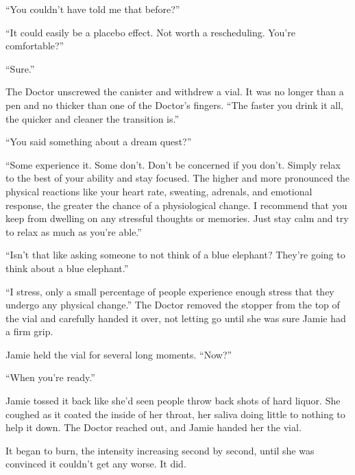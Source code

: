 ``You couldn't have told me that before?''



``It could easily be a placebo effect.  Not worth a rescheduling.  You're comfortable?''



``Sure.''



The Doctor unscrewed the canister and withdrew a vial.  It was no longer than a pen and no thicker than one of the Doctor's fingers.  ``The faster you drink it all, the quicker and cleaner the transition is.''



``You said something about a dream quest?''



``Some experience it.  Some don't.  Don't be concerned if you don't.  Simply relax to the best of your ability and stay focused.  The higher and more pronounced the physical reactions like your heart rate, sweating, adrenals, and emotional response, the greater the chance of a physiological change.  I recommend that you keep from dwelling on any stressful thoughts or memories.  Just stay calm and try to relax as much as you're able.''



``Isn't that like asking someone to not think of a blue elephant?  They're going to think about a blue elephant.''



``I stress, only a small percentage of people experience enough stress that they undergo any physical change.''  The Doctor removed the stopper from the top of the vial and carefully handed it over, not letting go until she was sure Jamie had a firm grip.



Jamie held the vial for several long moments.  ``Now?''



``When you're ready.''



Jamie tossed it back like she'd seen people throw back shots of hard liquor.  She coughed as it coated the inside of her throat, her saliva doing little to nothing to help it down.  The Doctor reached out, and Jamie handed her the vial.



It began to burn, the intensity increasing second by second, until she was convinced it couldn't get any worse.  It did.




